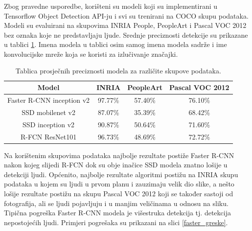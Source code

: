 Zbog pravedne usporedbe, korišteni su modeli koji su implementirani u Tensorflow Object Detection API-ju i svi su trenirani na COCO skupu podataka. Modeli su evaluirani na skupovima INRIA People, PeopleArt i Pascal VOC 2012 bez oznaka koje ne predstavljaju ljude. Srednje preciznosti detekcije su prikazane u tablici \ref{tablica_preciznosti}. Imena modela u tablici osim samog imena modela sadrže i ime konvolucijske mreže koja se koristi za izlučivanje značajki.

\begin{table}[h]
	\begin{center}
	\begin{tabular}{| c | c | c | c |}
		\hline
		Model & INRIA & PeopleArt & Pascal VOC 2012 \\ \hline
		Faster R-CNN inception v2 & 97.77\% & 57.40\% & 76.10\% \\ \hline
		SSD mobilenet v2 & 87.07\% & 35.39\% & 68.42\% \\ \hline
		SSD inception v2 & 90.87\% & 50.64\% & 71.60\% \\ \hline
		R-FCN ResNet101 & 96.73\% & 48.69\% & 72.72\% \\ \hline
	\end{tabular}

	\caption{Tablica prosječnih preciznosti modela za različite skupove podataka.}
	\label{tablica_preciznosti}
	\end{center}
\end{table}

Na korištenim skupovima podataka najbolje rezultate postiže Faster R-CNN nakon kojeg slijedi R-FCN dok su obje inačice SSD modela znatno lošije u detekciji ljudi.
Općenito, najbolje rezultate algoritmi postižu na INRIA skupu podataka u kojem su ljudi u prvom planu i zauzimaju velik dio slike, a nešto lošije rezultate postižu na skupu Pascal VOC 2012 koji se također sastoji od fotografija, ali se ljudi pojavljuju i u manjim veličinama u odnosu na sliku.
Tipična pogreška Faster R-CNN modela je višestruka detekcija tj. detekcija nepostojećih ljudi. Primjeri pogrešaka su prikazani na slici \ref{faster_greske}.

